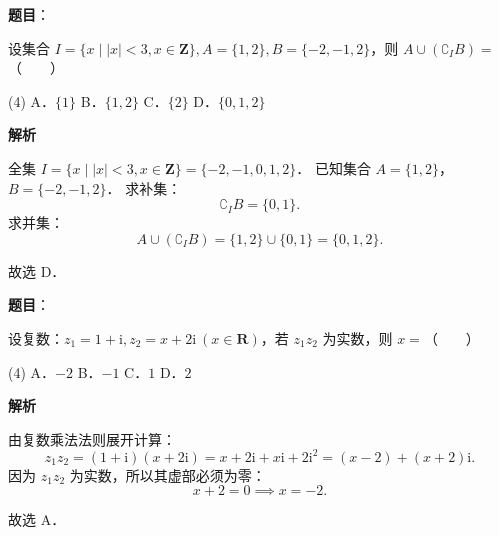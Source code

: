 
\begin{answer}

\textbf{题目}：

设集合 $I = \{x \mid |x| < 3, x \in \mathbf{Z}\}, A = \{1, 2\}, B = \{-2, -1, 2\}$，则 $A \cup (\complement_I B) =$\mbox{（　　）}

\begin{gkopts}(4)
\task A．$\{1\}$
\task B．$\{1, 2\}$
\task C．$\{2\}$
\task D．$\{0, 1, 2\}$
\end{gkopts}

\textbf{解析}

全集 $I = \{x \mid |x| < 3, x \in \mathbf{Z}\} = \{-2, -1, 0, 1, 2\}$．
已知集合 $A = \{1, 2\}$，$B = \{-2, -1, 2\}$．
求补集：
\nopagebreak[4]
\[
\complement_I B = \{0, 1\}.
\]
求并集：
\nopagebreak[4]
\[
A \cup (\complement_I B) = \{1, 2\} \cup \{0, 1\} = \{0, 1, 2\}.
\]

故选 D．


\end{answer}
\begin{answer}

\textbf{题目}：

设复数：$z_1 = 1 + \mathrm{i}, z_2 = x + 2\mathrm{i}\ (x \in \mathbf{R})$，若 $z_1 z_2$ 为实数，则 $x =$\mbox{（　　）}

\begin{gkopts}(4)
\task A．$-2$
\task B．$-1$
\task C．$1$
\task D．$2$
\end{gkopts}

\textbf{解析}

由复数乘法法则展开计算：
\nopagebreak[4]
\[
z_1 z_2 = (1 + \mathrm{i})(x + 2\mathrm{i}) = x + 2\mathrm{i} + x\mathrm{i} + 2\mathrm{i}^2 = (x - 2) + (x + 2)\mathrm{i}.
\]
因为 $z_1 z_2$ 为实数，所以其虚部必须为零：
\nopagebreak[4]
\[
x + 2 = 0 \implies x = -2.
\]

故选 A．


\end{answer}
